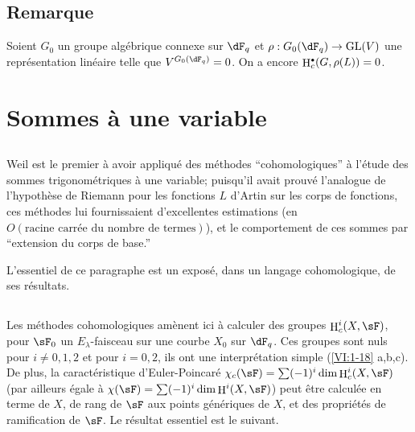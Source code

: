 \documentclass[oneside]{book}
\DeclareMathOperator{\h}{H}
\theoremstyle{sga-source}
\theoremstyle{sga-source-dash}
\theoremstyle{sga-source-dotdash}
\theoremstyle{sga-source-number-note-dash}
\theoremstyle{sga-source-note-number-dotdash}
\theoremstyle{sga-source-example-dotdash}
\theoremstyle{sga-source-inline-number}
\theoremstyle{sga-source-bare-number}
\theoremstyle{sga-source}
\let\oldbullet\bullet
\renewcommand{\bullet}{\textnormal{\tiny$\oldbullet$}}
\newcommand{\PrintPage}[1]{}\newcommand{\MathPage}[1]{}\newcommand{\PrintCite}[2]{#1}\newcommand{\var}[3]{#1}
\begin{document}
\subsection{Remarque}\label{VI:2-9}

Soient $G_0$ un groupe algébrique connexe sur $\dF_q$ et 
$\rho:G_0(\dF_q) \to \operatorname{GL}(V)$ une représentation linéaire 
telle que $V^{G_0(\dF_q)}=0$. On a encore $\h_c^\bullet(G,\rho(L))=0$. 










\PrintPage{189}
\section{Sommes à une variable}\label{VI:3}





\subsection{}\label{VI:3-1}

Weil est le premier à avoir appliqué des méthodes ``cohomologiques'' à 
l'étude des sommes trigonométriques à une variable; puisqu'il avait 
prouvé l'analogue de l'hypothèse de Riemann pour les fonctions $L$ d'Artin 
sur les corps de fonctions, ces méthodes lui fournissaient d'excellentes 
estimations (en $O(\text{racine carrée du nombre de termes})$), et le 
comportement de ces sommes par ``extension du corps de base.'' 

L'essentiel de ce paragraphe est un exposé, dans un langage cohomologique, de 
ses résultats. 





\subsection{}\label{VI:3-2}

Les méthodes cohomologiques amènent ici à calculer des groupes 
$\h_c^i(X,\sF)$, pour $\sF_0$ un $E_\lambda$-faisceau sur une courbe $X_0$ sur 
$\dF_q$. Ces groupes sont nuls pour $i\ne 0,1,2$ et pour 
$i=0,2$, ils ont une interprétation simple (\ref{VI:1-18} a,b,c). De plus, la 
caractéristique d'Euler-Poincaré 
$\chi_c(\sF) = \sum (-1)^i \dim \h_c^i(X,\sF)$ (par ailleurs égale à 
$\chi(\sF) = \sum (-1)^i \dim \h^i(X,\sF)$) peut être calculée en terme de 
$X$, de rang de $\sF$ aux points génériques de $X$, et des propriétés 
de ramification de $\sF$. Le résultat essentiel est le suivant. 
\end{document}
